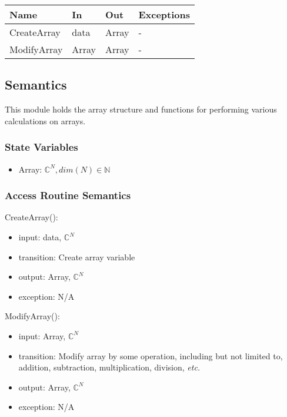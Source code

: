 \documentclass[12pt, titlepage]{article}
\begin{document}
\begin{center}
\begin{tabular}{p{2cm} p{4cm} p{4cm} p{2cm}}
\hline
\textbf{Name} & \textbf{In} & \textbf{Out} & \textbf{Exceptions} \\
\hline
CreateArray & data & Array & - \\
ModifyArray & Array & Array & - \\
\hline
\end{tabular}
\end{center}

\subsection{Semantics}
This module holds the array structure and functions for performing various calculations on arrays.

\subsubsection{State Variables}
\begin{itemize}
    \item Array: $\mathbb{C}^N, dim(N) \in \mathbb{N}$
\end{itemize}

\subsubsection{Access Routine Semantics}

\noindent CreateArray():
\begin{itemize}
    \item input: data, $\mathbb{C}^N$
    \item transition: Create array variable
    \item output: Array, $\mathbb{C}^N$
    \item exception: N/A
\end{itemize}

\noindent ModifyArray():
\begin{itemize}
    \item input: Array, $\mathbb{C}^N$
    \item transition: Modify array by some operation, including but not limited to, addition, subtraction, multiplication, division, \textit{etc.}
    \item output: Array, $\mathbb{C}^N$
    \item exception: N/A
\end{itemize}
\end{document}
